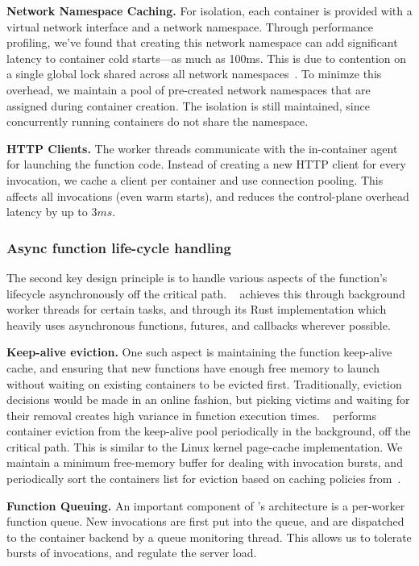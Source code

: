 \noindent \textbf{Network Namespace Caching.}
For isolation, each container is provided with a virtual network interface and a network namespace.
Through performance profiling, we've found that creating this network namespace can add significant latency to container cold starts---as much as 100ms.
This is due to contention on a single global lock shared across all network namespaces~\cite{oakes_sock_2018}. 
To minimze this overhead, we maintain a pool of pre-created network namespaces that are assigned during container creation. 
The isolation is still maintained, since concurrently running containers do not share the namespace. 

\noindent \textbf{HTTP Clients.}
The worker threads communicate with the in-container agent for launching the function code.
Instead of creating a new HTTP client for every invocation, we cache a client per container and use connection pooling. 
This affects all invocations (even warm starts), and reduces the control-plane overhead latency by up to $3ms$. 

\subsubsection{Async function life-cycle handling}

The second key design principle is to handle various aspects of the function's lifecycle asynchronously off the critical path.
\sysname~ achieves this through background worker threads for certain tasks, and through its Rust implementation which heavily uses asynchronous functions, futures, and callbacks wherever possible. 

\noindent \textbf{Keep-alive eviction.}
One such aspect is maintaining the function keep-alive cache, and ensuring that new functions have enough free memory to launch without waiting on existing containers to be evicted first.
Traditionally, eviction decisions would be made in an online fashion, but picking victims and waiting for their removal creates high variance in function execution times. 
\sysname~ performs container eviction from the keep-alive pool  periodically in the background, off the critical path. 
This is similar to the Linux kernel page-cache implementation. 
We maintain a minimum free-memory buffer for dealing with invocation bursts, and periodically sort the containers list for eviction based on caching policies from~\cite{faascache-asplos21}. 

\noindent \textbf{Function Queuing.}
An important component of \sysname's architecture is a per-worker function queue.
New invocations are first put into the queue, and are dispatched to the container backend by a queue monitoring thread. 
This allows us to tolerate bursts of invocations, and regulate the server load. 

